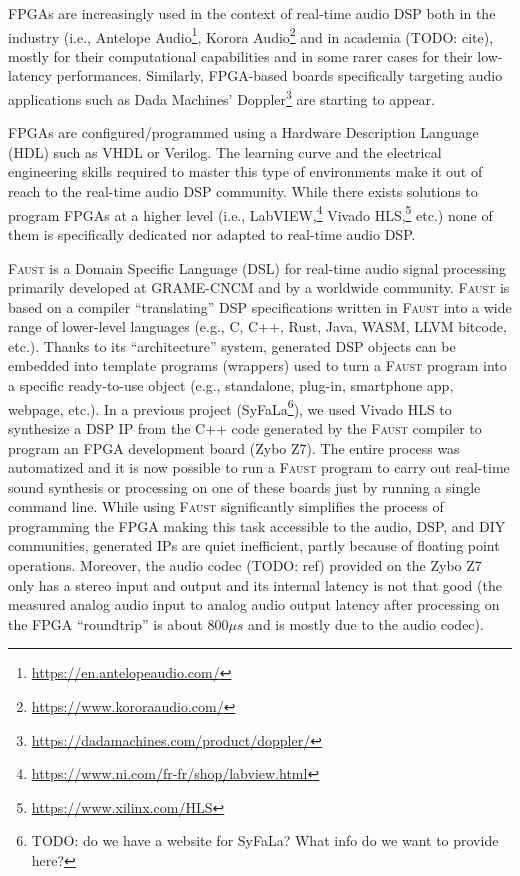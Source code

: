 \documentclass[a4paper,10pt]{article}
\newcommand{\F}{\textsc{Faust}}
\begin{document}
FPGAs are increasingly used in the context of real-time audio DSP both in the industry (i.e., Antelope Audio\footnote{\url{https://en.antelopeaudio.com/}}, Korora Audio\footnote{\url{https://www.kororaaudio.com/}} and in academia (TODO: cite), mostly for their computational capabilities and in some rarer cases for their low-latency performances. Similarly, FPGA-based boards specifically targeting audio applications such as Dada Machines' Doppler\footnote{\url{https://dadamachines.com/product/doppler/}} are starting to appear. 

FPGAs are configured/programmed using a Hardware Description Language (HDL) such as VHDL or Verilog. The learning curve and the electrical engineering skills required to master this type of environments make it out of reach to the real-time audio DSP community. While there exists solutions to program FPGAs at a higher level (i.e., LabVIEW,\footnote{\url{https://www.ni.com/fr-fr/shop/labview.html}} Vivado HLS,\footnote{\url{https://www.xilinx.com/HLS}} etc.) none of them is specifically dedicated nor adapted to real-time audio DSP. 

\F{} \cite{Orlarey2009} is a Domain Specific Language (DSL) for real-time audio signal processing primarily developed at GRAME-CNCM and by a worldwide community. \F{} is based on a compiler ``translating'' DSP specifications written in \F{} into a wide range of lower-level languages (e.g., C, C++, Rust, Java, WASM, LLVM bitcode, etc.). Thanks to its ``architecture'' system, generated DSP objects can be embedded into template programs (wrappers) used to turn a \F{} program into a specific ready-to-use object (e.g., standalone, plug-in, smartphone app, webpage, etc.). In a previous project (SyFaLa\footnote{TODO: do we have a website for SyFaLa? What info do we want to provide here?}), we used Vivado HLS to synthesize a DSP IP from the C++ code generated by the \F{} compiler to program an FPGA development board (Zybo Z7). The entire process was automatized and it is now possible to run a \F{} program to carry out real-time sound synthesis or processing on one of these boards just by running a single command line. While using \F{} significantly simplifies the process of programming the FPGA making this task accessible to the audio, DSP, and DIY communities, generated IPs are quiet inefficient, partly because of floating point operations. Moreover, the audio codec (TODO: ref) provided on the Zybo Z7 only has a stereo input and output and its internal latency is not that good (the measured analog audio input to analog audio output latency after processing on the FPGA ``roundtrip'' is about $800\mu s$ and is mostly due to the audio codec).
\end{document}
